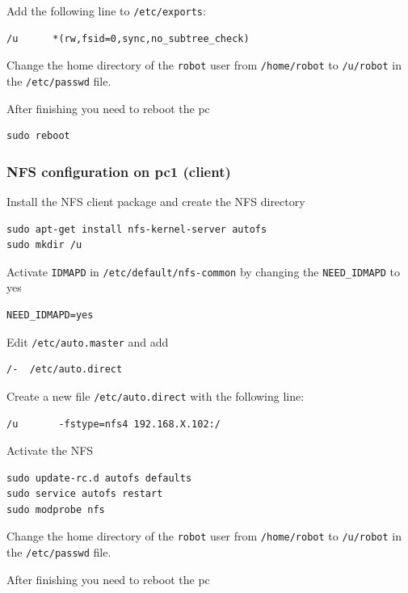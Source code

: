 Add the following line to \texttt{/etc/exports}:

\begin{lstlisting}
/u      *(rw,fsid=0,sync,no_subtree_check)
\end{lstlisting}


Change the home directory of the \texttt{robot} user from \texttt{/home/robot} to \texttt{/u/robot} in the \texttt{/etc/passwd} file.

After finishing you need to reboot the pc

\begin{lstlisting}
sudo reboot
\end{lstlisting}

\subsubsection{NFS configuration on pc1 (client)}
Install the NFS client package and create the NFS directory

\begin{lstlisting}
sudo apt-get install nfs-kernel-server autofs
sudo mkdir /u
\end{lstlisting}

Activate \texttt{IDMAPD} in \texttt{/etc/default/nfs-common} by changing the \texttt{NEED\_IDMAPD} to yes

\begin{lstlisting} 
NEED_IDMAPD=yes
\end{lstlisting}

Edit \texttt{/etc/auto.master} and add

\begin{lstlisting}
/-	/etc/auto.direct
\end{lstlisting}

Create a new file \texttt{/etc/auto.direct} with the following line:

\begin{lstlisting}
/u       -fstype=nfs4 192.168.X.102:/
\end{lstlisting}

Activate the NFS

\begin{lstlisting}
sudo update-rc.d autofs defaults
sudo service autofs restart
sudo modprobe nfs
\end{lstlisting}

Change the home directory of the \texttt{robot} user from \texttt{/home/robot} to \texttt{/u/robot} in the \texttt{/etc/passwd} file.

After finishing you need to reboot the pc

